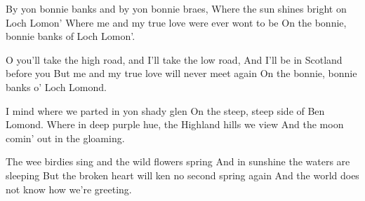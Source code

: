 
\beginverse
By yon bonnie banks and by yon bonnie braes,
Where the sun shines bright on Loch Lomon'
Where me and my true love were ever wont to be
On the bonnie, bonnie banks of Loch Lomon'.
\endverse

\beginchorus
O you’ll take the high road, and I’ll take the low road,
And I’ll be in Scotland before you
But me and my true love will never meet again
On the bonnie, bonnie banks o’ Loch Lomond.
\endchorus

\beginverse
I mind where we parted in yon shady glen
On the steep, steep side of Ben Lomond.
Where in deep purple hue, the Highland hills we view
And the moon comin’ out in the gloaming.
\endverse

\beginverse
The wee birdies sing and the wild flowers spring
And in sunshine the waters are sleeping
But the broken heart will ken no second spring again
And the world does not know how we're greeting. 
\endverse

\endsong